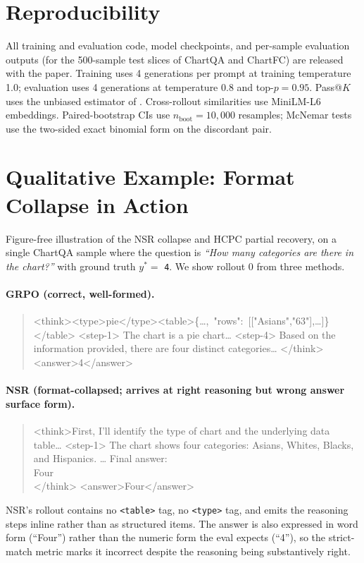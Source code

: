 \documentclass[11pt]{article}
\begin{document}


\appendix

\section{Reproducibility}
\label{sec:appendix}

All training and evaluation code, model checkpoints, and per-sample
evaluation outputs (for the 500-sample test slices of ChartQA and
ChartFC) are released with the paper. Training uses 4 generations per
prompt at training temperature 1.0; evaluation uses 4 generations at
temperature 0.8 and top-$p{=}0.95$. Pass@$K$ uses the unbiased
estimator of \citet{passatk}. Cross-rollout similarities use
MiniLM-L6 embeddings. Paired-bootstrap CIs use
$n_{\text{boot}}{=}10{,}000$ resamples; McNemar tests use the
two-sided exact binomial form on the discordant pair.

\section{Qualitative Example: Format Collapse in Action}
\label{sec:qualitative}

Figure-free illustration of the NSR collapse and HCPC partial
recovery, on a single ChartQA sample where the question is
\emph{``How many categories are there in the chart?''} with ground
truth $y^* = $ \texttt{4}. We show rollout 0 from three methods.

\paragraph{GRPO (correct, well-formed).}
\begin{quote}\footnotesize\ttfamily
<{}think><{}type>pie</type><{}table>\{\dots,~"rows":~[["Asians","63"],\dots]\}</table>
<{}step-1> The chart is a pie chart\dots
<{}step-4> Based on the information provided, there are four distinct categories\dots
</think>
<{}answer>4</answer>
\end{quote}

\paragraph{NSR (format-collapsed; arrives at right reasoning but
wrong answer surface form).}
\begin{quote}\footnotesize\ttfamily
<{}think>First, I'll identify the type of chart and the underlying
data table\dots
<{}step-1> The chart shows four categories: Asians, Whites, Blacks,
and Hispanics. \dots
Final answer:\\
Four\\
</think>
<{}answer>Four</answer>
\end{quote}
NSR's rollout contains no \texttt{<table>} tag, no \texttt{<type>}
tag, and emits the reasoning steps inline rather than as structured
items. The answer is also expressed in word form (``Four'') rather
than the numeric form the eval expects (``4''), so the strict-match
metric marks it incorrect despite the reasoning being substantively
right.
\end{document}
